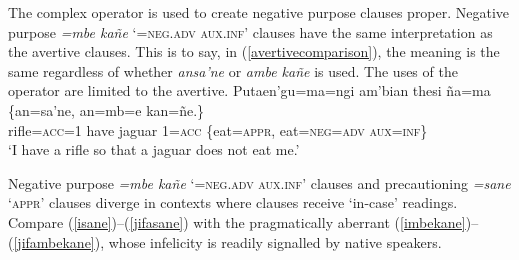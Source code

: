 \documentclass[output=paper,colorlinks,citecolor=brown]{langscibook}
\begin{document}
The complex operator %
is used to create negative purpose clauses proper. {Negative purpose \emph{=mbe kañe} `\textsc{=neg.adv aux.inf}' clauses have the same interpretation as the avertive  clauses. This is to say, in (\ref{avertivecomparison}), the meaning is the same regardless of whether \textit{ansa'ne} %
or \textit{ambe kañe} %
is used. The uses of the operator  are limited to the avertive.}
    \ea \label{avertivecomparison}
    \gll Putaen'gu=ma=ngi am'bian {\ob}thesi  ña=ma     {\rm\{}an=sa'ne,     an=mb=e          {kan=ñe.{\rm\}}{\cb}} \\
         rifle=\textsc{acc=1}  have    jaguar \textsc{1=acc} \{eat=\textsc{appr},      eat=\textsc{neg=adv} {\textsc{aux=inf\}}} \\
    \glt `I have a rifle so that a jaguar does not eat me.'
    \z 

Negative purpose \emph{=mbe kañe} `\textsc{=neg.adv aux.inf}' clauses and precautioning \emph{=sane} `\textsc{appr}' clauses diverge in contexts where  clauses receive `in-case' readings. Compare (\ref{isane})--(\ref{jifasane}) with the pragmatically aberrant (\ref{imbekane})--(\ref{jifambekane}), whose infelicity is readily signalled by native speakers.
\begin{exe}
\end{exe}



\end{document}
